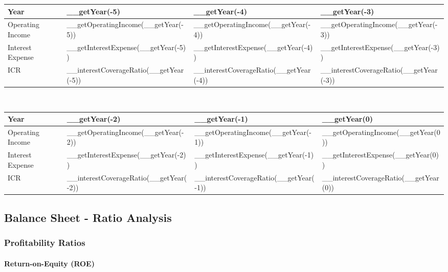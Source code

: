 \begin{tabularx}{\textwidth}{|X|X|X|X|}
 \hline
 Year                      & __getYear(-5)                          & __getYear(-4)                          & __getYear(-3)                          \\
 \hline
 Operating Income          & __getOperatingIncome(__getYear(-5))    & __getOperatingIncome(__getYear(-4))    & __getOperatingIncome(__getYear(-3))    \\
 Interest Expense          & __getInterestExpense(__getYear(-5))    & __getInterestExpense(__getYear(-4))    & __getInterestExpense(__getYear(-3))    \\
 \rowcolor{lightgray} ICR  & __interestCoverageRatio(__getYear(-5)) & __interestCoverageRatio(__getYear(-4)) & __interestCoverageRatio(__getYear(-3)) \\
 \hline
\end{tabularx}\\

\begin{tabularx}{\textwidth}{|X|X|X|X|}
 \hline
 Year                      & __getYear(-2)                          & __getYear(-1)                          & __getYear(0)                          \\
 \hline
 Operating Income          & __getOperatingIncome(__getYear(-2))    & __getOperatingIncome(__getYear(-1))    & __getOperatingIncome(__getYear(0))    \\
 Interest Expense          & __getInterestExpense(__getYear(-2))    & __getInterestExpense(__getYear(-1))    & __getInterestExpense(__getYear(0))    \\
 \rowcolor{lightgray} ICR  & __interestCoverageRatio(__getYear(-2)) & __interestCoverageRatio(__getYear(-1)) & __interestCoverageRatio(__getYear(0)) \\
 \hline
\end{tabularx}

\subsection{Balance Sheet - Ratio Analysis}

\subsubsection{Profitability Ratios}

\paragraph{Return-on-Equity (ROE)}

